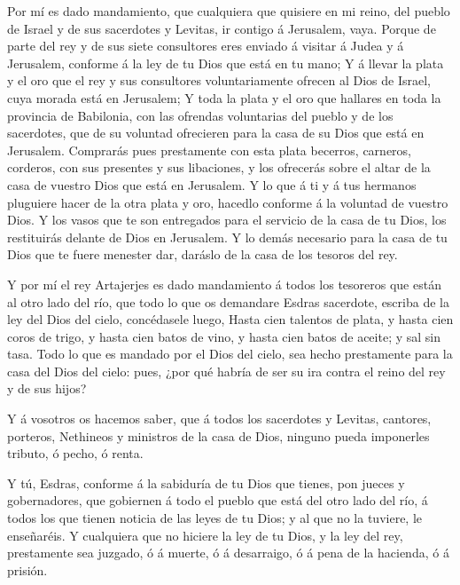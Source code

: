  Por mí es dado mandamiento, que cualquiera que quisiere en
mi reino, del pueblo de Israel y de sus sacerdotes y Levitas, ir contigo
á Jerusalem, vaya.  Porque de parte del rey y de sus siete
consultores eres enviado á visitar á Judea y á Jerusalem, conforme á la
ley de tu Dios que está en tu mano;  Y á llevar la plata y
el oro que el rey y sus consultores voluntariamente ofrecen al Dios de
Israel, cuya morada está en Jerusalem;  Y toda la plata y
el oro que hallares en toda la provincia de Babilonia, con las ofrendas
voluntarias del pueblo y de los sacerdotes, que de su voluntad
ofrecieren para la casa de su Dios que está en Jerusalem. 
Comprarás pues prestamente con esta plata becerros, carneros, corderos,
con sus presentes y sus libaciones, y los ofrecerás sobre el altar de la
casa de vuestro Dios que está en Jerusalem.  Y lo que á ti
y á tus hermanos pluguiere hacer de la otra plata y oro, hacedlo
conforme á la voluntad de vuestro Dios.  Y los vasos que te
son entregados para el servicio de la casa de tu Dios, los restituirás
delante de Dios en Jerusalem.  Y lo demás necesario para la
casa de tu Dios que te fuere menester dar, daráslo de la casa de los
tesoros del rey.

 Y por mí el rey Artajerjes es dado mandamiento á todos los
tesoreros que están al otro lado del río, que todo lo que os demandare
Esdras sacerdote, escriba de la ley del Dios del cielo, concédasele
luego,  Hasta cien talentos de plata, y hasta cien coros de
trigo, y hasta cien batos de vino, y hasta cien batos de aceite; y sal
sin tasa.  Todo lo que es mandado por el Dios del cielo,
sea hecho prestamente para la casa del Dios del cielo: pues, ¿por qué
habría de ser su ira contra el reino del rey y de sus hijos?

 Y á vosotros os hacemos saber, que á todos los sacerdotes
y Levitas, cantores, porteros, Nethineos y ministros de la casa de Dios,
ninguno pueda imponerles tributo, ó pecho, ó renta.

 Y tú, Esdras, conforme á la sabiduría de tu Dios que
tienes, pon jueces y gobernadores, que gobiernen á todo el pueblo que
está del otro lado del río, á todos los que tienen noticia de las leyes
de tu Dios; y al que no la tuviere, le enseñaréis.  Y
cualquiera que no hiciere la ley de tu Dios, y la ley del rey,
prestamente sea juzgado, ó á muerte, ó á desarraigo, ó á pena de la
hacienda, ó á prisión.

